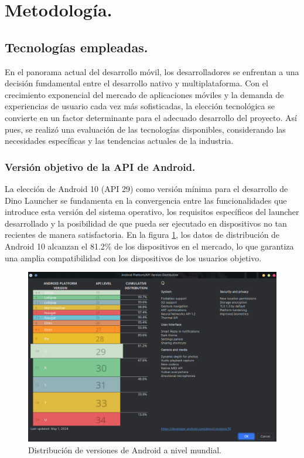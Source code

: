 \section{Metodología.}

\subsection{Tecnologías empleadas.}

En el panorama actual del desarrollo móvil, los desarrolladores se enfrentan a una decisión fundamental entre el desarrollo nativo y multiplataforma. Con el crecimiento exponencial del mercado de aplicaciones móviles y la demanda de experiencias de usuario cada vez más sofisticadas, la elección tecnológica se convierte en un factor determinante para el adecuado desarrollo del proyecto. Así pues, se realizó una evaluación de las tecnologías disponibles, considerando las necesidades específicas y las tendencias actuales de la industria.

\subsubsection{Versión objetivo de la API de Android.}

La elección de Android 10 (API 29) como versión mínima para el desarrollo de Dino Launcher se fundamenta en la convergencia entre las funcionalidades que introduce esta versión del sistema operativo, los requisitos específicos del launcher desarrollado y la posibilidad de que pueda ser ejecutado en dispositivos no tan recientes de manera satisfactoria. En la figura \ref{fig:versiones_android}, los datos de distribución de Android 10 alcanzan el 81.2\% de los dispositivos en el mercado, lo que garantiza una amplia compatibilidad con los dispositivos de los usuarios objetivo. 

\begin{figure}[H]
\caption{Distribución de versiones de Android a nivel mundial. \cite{AndroidStudio}}
\label{fig:versiones_android}
\includegraphics[width=\textwidth]{Figuras/versiones_android.png}
\centering
\end{figure}

